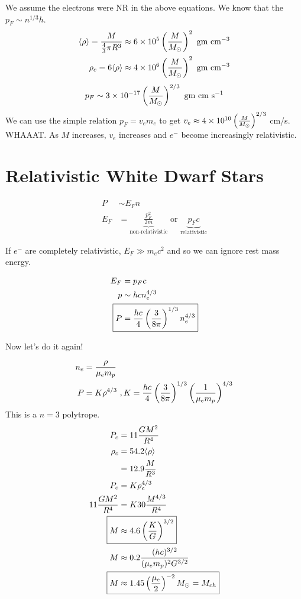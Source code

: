We assume the electrons were NR in the above equations. We know that the $p_F\sim n^{1/3}h$.
\begin{align}
\langle \rho \rangle = \frac{M}{\frac{4}{3} \pi R^3}\approx 6 \times 10^5 \left( \frac{M}{M_\odot}\right)^2\textrm{ gm cm}^{-3}\\
\rho_c = 6\langle \rho \rangle \approx 4 \times 10^6 \left( \frac{M}{M_\odot}\right)^2 \textrm{ gm cm}^{-3}
\end{align}
\begin{align}
p_F \sim 3 \times 10^{-17} \left( \frac{M}{M_\odot}\right)^{2/3} \textrm{ gm cm s}^{-1}
\end{align}
We can use the simple relation $p_F = v_em_e$ to get $v_e \approx 4 \times 10^{10} \left( \frac{M}{M_\odot}\right)^{2/3}$ cm/s. WHAAAT. As $M$ increases, $v_e$ increases and $e^-$ become increasingly relativistic. 

\section{Relativistic White Dwarf Stars}

\begin{align}
P &\sim E_F n\\
E_F &= \underbrace{\frac{p_F^2}{2m}}_{\textrm{non-relativistic}} \textrm{ or } \underbrace{p_Fc}_{\textrm{relativistic}}
\end{align}

If $e^-$ are completely relativistic, $E_F \gg m_ec^2$ and so we can ignore rest mass energy. 

\begin{align}
E_F &= p_Fc\\
p &\sim hcn_e^{4/3}\\
\Aboxed{P &= \frac{hc}{4} \lp \frac{3}{8\pi}\rp^{1/3}n_e^{4/3}}
\end{align}

Now let's do it again!

\begin{align}
n_e& = \frac{\rho}{\mu_e m_p}\\
P &= K\rho^{4/3}~,K = \frac{hc}{4} \left( \frac{3}{8\pi} \right)^{1/3} \left( \frac{1}{\mu_e m_p}\right)^{4/3}
\end{align}
This is a $n=3$ polytrope.
\begin{align}
P_c &= 11 \frac{GM^2}{R^4}\\
\rho_c &= 54.2 \langle \rho \rangle \\
&= 12.9 \frac{M}{R^3}\\
P_c &= K\rho_c^{4/3}\\
11 \frac{GM^2}{R^4} &= K30\frac{M^{4/3}}{R^4}\\
\Aboxed{M &\approx 4.6 \lp \frac{K}{G} \rp^{3/2}}\\
M &\approx 0.2 \frac{(hc)^{3/2}}{(\mu_e m_p)^2G^{3/2}}\\
\Aboxed{M &\approx 1.45 \lp \frac{\mu_e}{2} \rp^{-2} \ms = M_{ch}}
\end{align}

